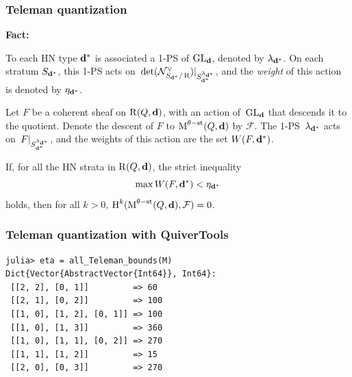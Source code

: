 \documentclass{beamer}
\begin{document}
\begin{frame}
    \frametitle{Teleman quantization}
\textbf{Fact:}

To each HN type $\mathbf{d}^*$ is associated a 1-PS of $\operatorname{GL}_{\mathbf{d}}$,
denoted by $\lambda_{\mathbf{d}^*}$.
On each stratum $S_{\mathbf{d}^*}$, this 1-PS acts
on~$\det(\mathcal{N}^{\vee}_{S_{\mathbf{d}^*}/\operatorname{R}})|_{S_{\mathbf{d}^*}^{\lambda_{\mathbf{d}^*}}}$,
and the \emph{weight} of this action is denoted by $\eta_{\mathbf{d}^*}$. \pause

Let $F$ be a coherent sheaf on $\operatorname{R}(Q, \mathbf{d})$, with an action of~$\operatorname{GL}_{\mathbf{d}}$
that descends it to the quotient.
Denote the descent of $F$ to $\operatorname{M}^{\theta-\mathrm{st}}(Q,\mathbf{d})$ by $\mathcal{F}$. \pause
The 1-PS~$\lambda_{\mathbf{d}^*}$ acts on~$F|_{S_{\mathbf{d}^*}^{\lambda_{\mathbf{d}^*}}}$,
and the weights of this action are the set $W(F, \mathbf{d}^*)$. \pause

\begin{theorem}
If, for all the HN strata in $\operatorname{R}(Q, \mathbf{d})$,
the strict inequality
\[\max W(F, \mathbf{d}^*) < \eta_{\mathbf{d}^*}\]
holds, then for all $k > 0$, $\operatorname{H}^k(\operatorname{M}^{\theta-\mathrm{st}}(Q,\mathbf{d}), \mathcal{F}) = 0$.
\end{theorem}
\end{frame}

\begin{frame}[fragile]
    \frametitle{Teleman quantization with QuiverTools}
\small{
\begin{lstlisting}
julia> eta = all_Teleman_bounds(M)
Dict{Vector{AbstractVector{Int64}}, Int64}:
 [[2, 2], [0, 1]]         => 60
 [[2, 1], [0, 2]]         => 100
 [[1, 0], [1, 2], [0, 1]] => 100
 [[1, 0], [1, 3]]         => 360
 [[1, 0], [1, 1], [0, 2]] => 270
 [[1, 1], [1, 2]]         => 15
 [[2, 0], [0, 3]]         => 270
\end{lstlisting}
}
\end{frame}
\end{document}
